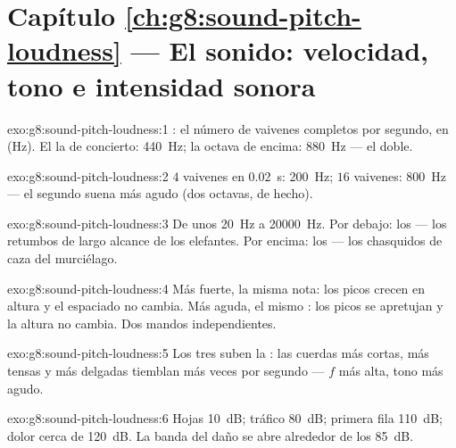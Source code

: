 \section*{Capítulo \ref{ch:g8:sound-pitch-loudness} --- El sonido: velocidad, tono e intensidad sonora}

\begin{solution}{exo:g8:sound-pitch-loudness:1}
: el número de vaivenes completos por segundo, en
 (\unit{Hz}). El la de concierto: \qty{440}{Hz}; la octava
de encima: \qty{880}{Hz} --- el doble.
\end{solution}

\begin{solution}{exo:g8:sound-pitch-loudness:2}
$4$ vaivenes en \qty{0.02}{s}: \qty{200}{Hz}; $16$ vaivenes:
\qty{800}{Hz} --- el segundo suena más agudo (dos octavas, de
hecho).
\end{solution}

\begin{solution}{exo:g8:sound-pitch-loudness:3}
De unos \qty{20}{Hz} a \qty{20000}{Hz}. Por debajo: los
 --- los retumbos de largo alcance de los elefantes.
Por encima: los  --- los chasquidos de caza del
murciélago.
\end{solution}

\begin{solution}{exo:g8:sound-pitch-loudness:4}
Más fuerte, la misma nota: los picos crecen en altura y el espaciado no
cambia. Más aguda, el mismo : los picos se apretujan y la altura
no cambia. Dos mandos independientes.
\end{solution}

\begin{solution}{exo:g8:sound-pitch-loudness:5}
Los tres suben la : las cuerdas más cortas, más tensas
y más delgadas tiemblan más veces por segundo --- $f$ más alta, tono
más agudo.
\end{solution}

\begin{solution}{exo:g8:sound-pitch-loudness:6}
Hojas \qty{10}{dB}; tráfico \qty{80}{dB}; primera fila \qty{110}{dB};
dolor cerca de \qty{120}{dB}. La banda del daño se abre alrededor de
los \qty{85}{dB}.
\end{solution}

